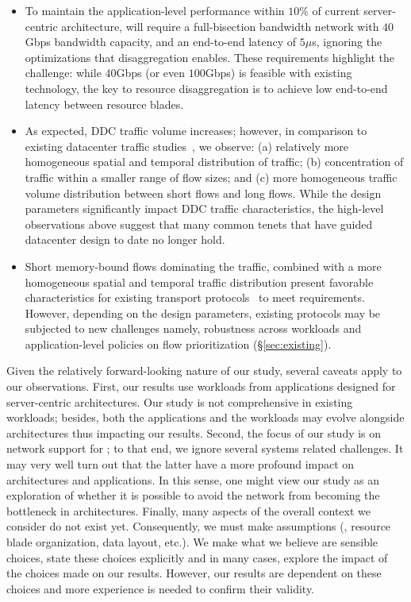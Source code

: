 \begin{itemize}[leftmargin=*]
	\itemsep0em
		\item To maintain the application-level performance within $10\%$ of current server-centric architecture, \dis will require a full-bisection bandwidth network with $40$Gbps bandwidth capacity, and an end-to-end latency of $5\mu$s, ignoring the optimizations that disaggregation enables. These requirements highlight the challenge: while $40$Gbps (or even $100$Gbps) is feasible with existing technology, the key to resource disaggregation is to achieve low end-to-end latency between resource blades.  
	    \item As expected, DDC traffic volume increases; however, in comparison to existing datacenter traffic studies~\cite{srikanth, theo}, we observe: (a) relatively more homogeneous spatial and temporal distribution of traffic; (b) concentration of traffic within a smaller range of flow sizes; and (c) more homogeneous traffic volume distribution between short flows and long flows. While the design parameters significantly impact DDC traffic characteristics, the high-level observations above suggest that many common tenets that have guided datacenter design to date no longer hold. 
        \item Short memory-bound flows dominating the \dis traffic, combined with a more homogeneous spatial and temporal traffic distribution present favorable characteristics for existing transport protocols~\cite{pfabric} to meet \dis requirements. However, depending on the design parameters, existing protocols may be subjected to new challenges namely, robustness across workloads and application-level policies on flow prioritization (\S\ref{sec:existing}).  
\end{itemize}

\noindent
Given the relatively forward-looking nature of our study, several caveats apply to our observations. First, our results use workloads from applications designed for server-centric architectures. Our study is not comprehensive in existing workloads; besides, both the applications and the workloads may evolve alongside \dis architectures thus impacting  our results. Second, the focus of our study is on network support for \dis; to that end, we ignore several systems related challenges. It may very well turn out that the latter have a more profound impact on \dis architectures and applications. In this sense, one might view our study as an exploration of whether it is possible to avoid the network from becoming the bottleneck in \dis architectures. Finally, many aspects of the overall \dis context we consider do not exist yet. Consequently, we must make assumptions (\eg, resource blade organization, data layout, etc.). We make what we believe are sensible choices, state these choices explicitly and in many cases, explore the impact of the choices made on our results. However, our results are dependent on these choices and more experience is needed to confirm their validity.

